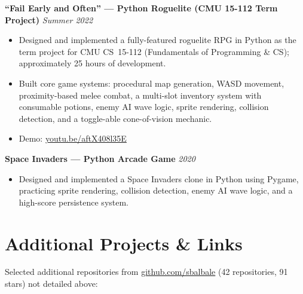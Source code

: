 \documentclass[10pt, letterpaper]{article}
\newcommand{\cvproject}[2]{\textbf{#1} \hfill \textit{#2}\vspace{1pt}}
\begin{document}
\cvproject{``Fail Early and Often'' --- Python Roguelite (CMU 15-112 Term Project)}{Summer 2022}
\begin{itemize}
  \item Designed and implemented a fully-featured roguelite RPG in Python as the term project
        for CMU CS~15-112 (Fundamentals of Programming \& CS); approximately 25 hours of
        development.
  \item Built core game systems: procedural map generation, WASD movement, proximity-based melee
        combat, a multi-slot inventory system with consumable potions, enemy AI wave logic, sprite
        rendering, collision detection, and a toggle-able cone-of-vision mechanic.
  \item Demo: \href{https://youtu.be/aftX408l35E}{youtu.be/aftX408l35E}
\end{itemize}

\vspace{4pt}

\cvproject{Space Invaders --- Python Arcade Game}{2020}
\begin{itemize}
  \item Designed and implemented a Space Invaders clone in Python using Pygame, practicing sprite
        rendering, collision detection, enemy AI wave logic, and a high-score persistence system.
\end{itemize}

\section{Additional Projects \& Links}

Selected additional repositories from
\href{https://github.com/sbalbale}{github.com/sbalbale} (42 repositories, 91 stars) not detailed above:
\end{document}
